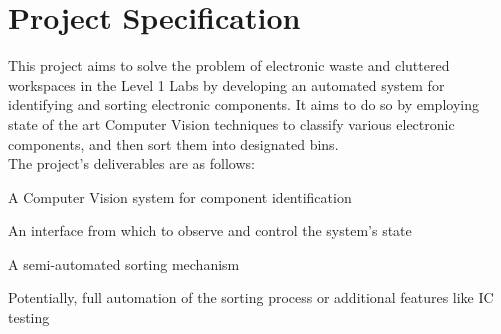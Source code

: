 \section{Project Specification}
This project aims to solve the problem of electronic waste and cluttered workspaces in the Level 1 Labs
by developing an automated system for identifying and sorting electronic components.
It aims to do so by employing state of the art Computer Vision techniques to classify various electronic components,
and then sort them into designated bins. \\
The project's deliverables are as follows:
\begin{mylist}
  \item A Computer Vision system for component identification
  \item An interface from which to observe and control the system's state
  \item A semi-automated sorting mechanism
  \item Potentially, full automation of the sorting process or additional features like IC testing
\end{mylist}